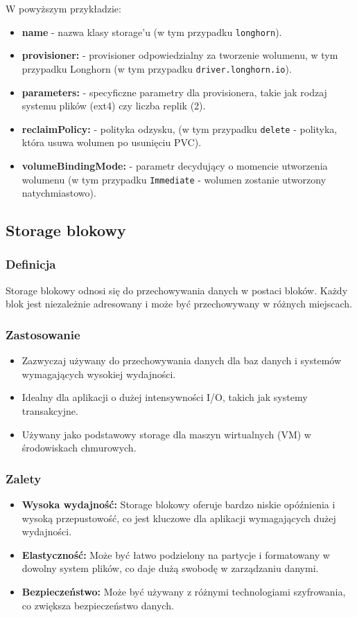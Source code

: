 \documentclass[polish,envcountsect,10pt]{article}
\begin{document}
\noindent W powyższym przykładzie:
\begin{itemize}
	\item \textbf{name} - nazwa klasy storage'u (w tym przypadku \texttt{longhorn}).
	\item \textbf{provisioner:} - provisioner odpowiedzialny za tworzenie wolumenu, w tym przypadku Longhorn (w tym przypadku \texttt{driver.longhorn.io}).
    \item \textbf{parameters:} - specyficzne parametry dla provisionera, takie jak rodzaj systemu plików (ext4) czy liczba replik (2).
	\item \textbf{reclaimPolicy:} - polityka odzysku, (w tym przypadku \texttt{delete} - polityka, która usuwa wolumen po usunięciu PVC).
	\item \textbf{volumeBindingMode:} - parametr decydujący o momencie utworzenia wolumenu (w tym przypadku \texttt{Immediate} - wolumen zostanie utworzony natychmiastowo).
\end{itemize}

\subsection{Storage blokowy}

\subsubsection{Definicja}
Storage blokowy odnosi się do przechowywania danych w postaci bloków. Każdy blok jest niezależnie adresowany i może być przechowywany w różnych miejscach.

\subsubsection{Zastosowanie}
\begin{itemize}
    \item Zazwyczaj używany do przechowywania danych dla baz danych i systemów wymagających wysokiej wydajności.
    \item Idealny dla aplikacji o dużej intensywności I/O, takich jak systemy transakcyjne.
    \item Używany jako podstawowy storage dla maszyn wirtualnych (VM) w środowiskach chmurowych.
\end{itemize}

\subsubsection{Zalety}
\begin{itemize}
    \item \textbf{Wysoka wydajność:} Storage blokowy oferuje bardzo niskie opóźnienia i wysoką przepustowość, co jest kluczowe dla aplikacji wymagających dużej wydajności.
    \item \textbf{Elastyczność:} Może być łatwo podzielony na partycje i formatowany w dowolny system plików, co daje dużą swobodę w zarządzaniu danymi.
    \item \textbf{Bezpieczeństwo:} Może być używany z różnymi technologiami szyfrowania, co zwiększa bezpieczeństwo danych.
\end{itemize}
\end{document}
